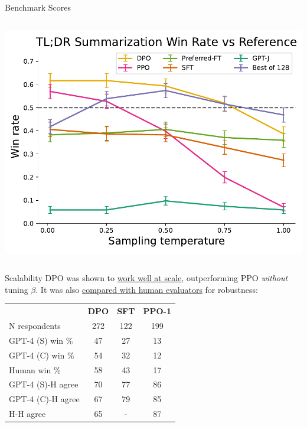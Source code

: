 \documentclass{beamer}
\begin{document}
\begin{frame}{Benchmark Scores}
\begin{columns}
\begin{column}{0.34\textwidth}
			\includegraphics[width=\textwidth]{img/results/tldr_winrate_vs_temp.pdf}
		\end{column}
	\end{columns}
\end{frame}

\begin{frame}{Scalability}
	DPO was shown to \underline{work well at scale}, outperforming PPO \textit{without} tuning $\beta$. \pause It was also \underline{compared with human evaluators} for robustness:
	\begin{table}
		\small
		\begin{tabular}{lccc}
			\toprule
			& \textbf{DPO} & \textbf{SFT} & \textbf{PPO-1} \\
			\cmidrule(lr){2-4}
			N respondents & 272 & 122 & 199 \\
			\midrule
			GPT-4 (S) win \% & 47 & 27 & 13 \\
			GPT-4 (C) win \% & 54 & 32 & 12 \\
			Human win \% & 58 & 43 & 17 \\
			\midrule
			GPT-4 (S)-H agree & 70 & 77 & 86 \\
			GPT-4 (C)-H agree & 67 & 79 & 85 \\
			H-H agree & 65 & - & 87 \\
			\bottomrule
		\end{tabular}
	\end{table}
\end{frame}
\end{document}
